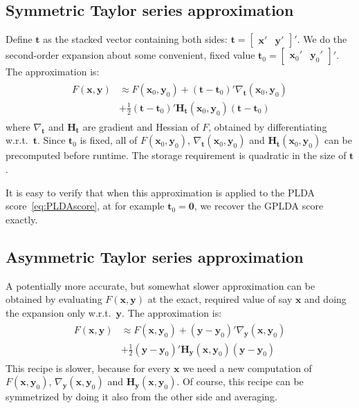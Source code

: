 \documentclass[a4paper,oneside,12pt,english]{report}
\def\Hmat{\mathbf{H}}
\def\yvec{\mathbf{y}}
\def\xvec{\mathbf{x}}
\def\nulvec{\boldsymbol{0}}
\def\bmat#1{\begin{bmatrix}#1\end{bmatrix}}
\begin{document}
\subsection{Symmetric Taylor series approximation}
\def\tvec{\mathbf{t}}
Define $\tvec$ as the stacked vector containing both sides: $\tvec=\bmat{\xvec'&\yvec'}'$. We do the second-order expansion about some convenient, fixed value $\tvec_0=\bmat{\xvec_0'&\yvec_0'}'$. The approximation is:
\begin{align}
\begin{split}
F(\xvec,\yvec) &\approx F(\xvec_0,\yvec_0) + (\tvec-\tvec_0)'\nabla_\tvec(\xvec_0,\yvec_0)\\ 
&+ \frac12(\tvec-\tvec_0)'\Hmat_\tvec(\xvec_0,\yvec_0)(\tvec-\tvec_0)
\end{split}
\end{align} 
where $\nabla_\tvec$ and $\Hmat_\tvec$ are gradient and Hessian of $F$, obtained by differentiating w.r.t.\ $\tvec$. Since $\tvec_0$ is fixed, all of $F(\xvec_0,\yvec_0)$, $\nabla_\tvec(\xvec_0,\yvec_0)$ and $\Hmat_\tvec(\xvec_0,\yvec_0)$ can be precomputed before runtime. The storage requirement is quadratic in the size of $\tvec$.

It is easy to verify that when this approximation is applied to the PLDA score~\eqref{eq:PLDAscore}, at for example $\tvec_0=\nulvec$, we recover the GPLDA score exactly. 


\subsection{Asymmetric Taylor series approximation}
A potentially more accurate, but somewhat slower approximation can be obtained by evaluating $F(\xvec,\yvec)$ at the exact, required value of say $\xvec$ and doing the expansion only w.r.t.\ $\yvec$. The approximation is:  
\begin{align}
\begin{split}
F(\xvec,\yvec) &\approx F(\xvec,\yvec_0) + (\yvec-\yvec_0)'\nabla_\yvec(\xvec,\yvec_0)\\
&+ \frac12(\yvec-\yvec_0)'\Hmat_\yvec(\xvec,\yvec_0)(\yvec-\yvec_0)
\end{split}
\end{align} 
This recipe is slower, because for every $\xvec$ we need a new computation of $F(\xvec,\yvec_0)$, $\nabla_\yvec(\xvec,\yvec_0)$ and $\Hmat_\yvec(\xvec,\yvec_0)$. Of course, this recipe can be symmetrized by doing it also from the other side and averaging.
\end{document}
